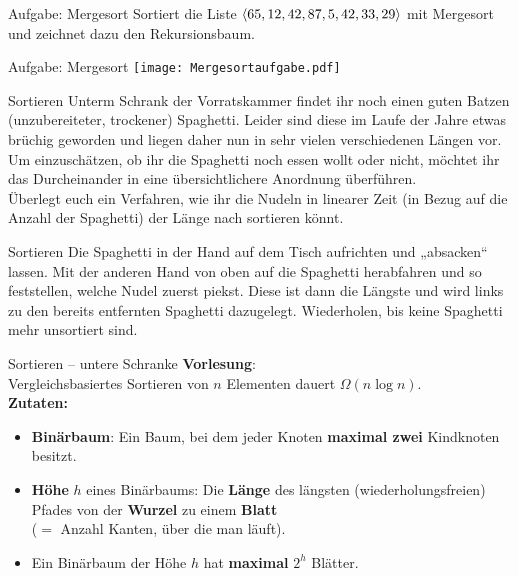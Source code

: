 \begin{frame}{Aufgabe: Mergesort}
	Sortiert die Liste $\langle 65,12,42,87,5,42,33,29 \rangle$ mit Mergesort und zeichnet dazu den Rekursionsbaum.
\end{frame}

\begin{frame}{Aufgabe: Mergesort}
	\solutionheading
	\medskip
	\centering
	\texttt{[image: Mergesortaufgabe.pdf]}
\end{frame}

\begin{frame}{Sortieren}
	Unterm Schrank der Vorratskammer findet ihr noch einen guten Batzen (unzubereiteter, trockener) Spaghetti. Leider sind diese im Laufe der Jahre etwas brüchig geworden und liegen daher nun in sehr vielen verschiedenen Längen vor. Um einzuschätzen, ob ihr die Spaghetti noch essen wollt oder nicht, möchtet ihr das Durcheinander in eine übersichtlichere Anordnung überführen. \\
	\medskip
	Überlegt euch ein Verfahren, wie ihr die Nudeln in linearer Zeit (in Bezug auf die Anzahl der Spaghetti) der Länge nach sortieren könnt.
\end{frame}

\begin{frame}{Sortieren}
	\solutionheading 
	Die Spaghetti in der Hand auf dem Tisch aufrichten und „absacken“ lassen. Mit der anderen Hand von oben auf die Spaghetti herabfahren und so feststellen, welche Nudel zuerst piekst. Diese ist dann die Längste und wird links zu den bereits entfernten Spaghetti dazugelegt. Wiederholen, bis keine Spaghetti mehr unsortiert sind.
\end{frame}

\begin{frame}[t]{Sortieren – untere Schranke}
	\textbf{Vorlesung}: \\
	\quad Vergleichsbasiertes Sortieren von $n$ Elementen dauert $\Omega(n \log n)$. \\
	\pause
	\bigskip
	\textbf{Zutaten:} 
	\begin{itemize}[<+->]
		\item \textbf{Binärbaum}: Ein Baum, bei dem jeder Knoten \textbf{maximal zwei} Kindknoten besitzt.
		\item \textbf{Höhe} $h$ eines Binärbaums: Die \textbf{Länge} des längsten (wiederholungsfreien) Pfades von der \textbf{Wurzel} zu einem \textbf{Blatt} \\ {\small ($=$ Anzahl Kanten, über die man läuft)}. 
		\item Ein Binärbaum der Höhe $h$ hat \textbf{maximal} $2^h$  Blätter.
	\end{itemize}	
\end{frame}

